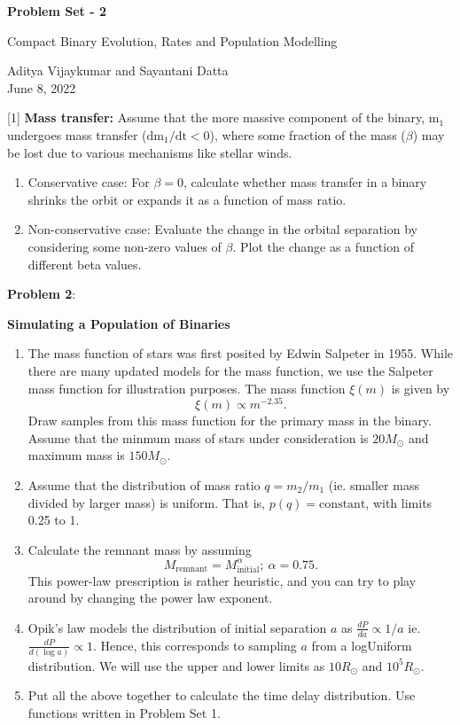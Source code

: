 \documentclass{article} %
\newcommand{\question}[2][]{\begin{flushleft}
        \textbf{Problem #1}: %
\end{flushleft}
}
\newcommand{\maketitletwo}[2][]{\begin{center}
        \Large{\textbf{Problem Set - 2}
            
            Compact Binary Evolution, Rates and Population Modelling} %
        \vspace{10pt}
        
        \normalsize{Aditya Vijaykumar and Sayantani Datta  %
        } \\
        \vspace{5pt}  June 8, 2022     %
        \vspace{15pt}
        
\end{center}}
\begin{document}
    \maketitletwo[5]  %
    
     \question[1]{} \textbf{Mass transfer:} Assume that the more massive component of the binary, $\mathrm{m_1}$ undergoes mass transfer ($\mathrm{dm_1/dt <0}$), where some fraction of the mass ($\beta$) may be lost due to various mechanisms like stellar winds.
     
     \begin{enumerate}
     \item Conservative case: For $\beta=0$, calculate whether mass transfer in a binary shrinks the orbit or expands it as a function of mass ratio.
     \item Non-conservative case: Evaluate the change in the orbital separation by considering some non-zero values of $\beta$. Plot the change as a function of different beta values.

     \end{enumerate}
     
     
     
    
    \question[2]{} \textbf{Simulating a Population of Binaries} 
    
    \begin{enumerate}
    \item The mass function of stars was first posited by Edwin Salpeter in 1955. While there are many updated models for the mass function, we use the Salpeter mass function for illustration purposes. The mass function $\xi(m)$ is given by $$\xi(m) \propto m^{-2.35}.$$ Draw samples from this mass function for the primary mass in the binary. Assume that the minmum mass of stars under consideration is $20 M_\odot$ and maximum mass is $150 M_\odot$. 
    
    \item Assume that the distribution of mass ratio $q=m_2/m_1$ (ie. smaller mass divided by larger mass) is uniform. That is, $p(q) = \mathrm{constant}$, with limits 0.25 to 1.
    
    \item Calculate the remnant mass by assuming $$M_\mathrm{remnant} = M_\mathrm{initial}^{\alpha}; \ \alpha = 0.75.$$ This power-law prescription is rather heuristic, and you can try to play around by changing the power law exponent.
    
    
    \item Opik's law models the distribution of initial separation $a$  as $\frac{dP}{da} \propto 1/a $ ie. $\frac{dP}{d(\log a)} \propto 1$. Hence, this corresponds to sampling $a$ from a logUniform distribution. We will use the upper and lower limits as $10 R_\odot$ and $10^5 R_\odot$.
    \item  Put all the above together to calculate the time delay distribution. Use functions written in Problem Set 1.
\end{enumerate}
\end{document}

